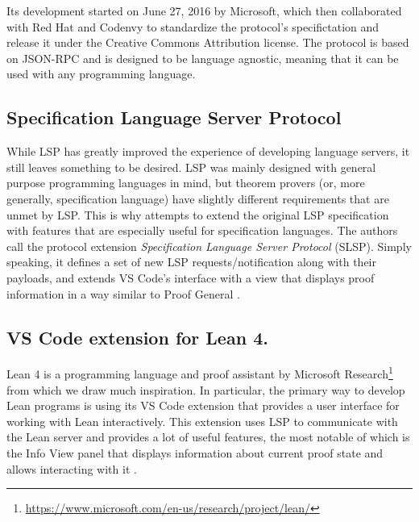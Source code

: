 Its development started on June 27, 2016 by Microsoft, which then collaborated with Red Hat and Codenvy to standardize the protocol's specifictation and release it under the Creative Commons Attribution license.
The protocol is based on JSON-RPC and is designed to be language agnostic, meaning that it can be used with any programming language.


\subsection{Specification Language Server Protocol}

While LSP has greatly improved the experience of developing language servers,
it still leaves something to be desired.
LSP was mainly designed with general purpose programming languages in mind,
but theorem provers (or, more generally, specification language) have slightly
different requirements that are unmet by LSP.
This is why \cite{JonasKjaerRask2021} attempts to extend the original LSP
specification with features that are especially useful for specification languages.
The authors call the protocol extension \textit{Specification Language Server Protocol} (SLSP).
Simply speaking, it defines a set of new LSP requests/notification along with
their payloads, and extends VS Code's interface with a view that displays proof
information in a way similar to Proof General \cite{Aspinall2000}.





\subsection{VS Code extension for Lean 4.}

Lean 4 \cite{deMouraUllrich2021} is a programming language and proof assistant
by Microsoft Research\footnote{\url{https://www.microsoft.com/en-us/research/project/lean/}}
from which we draw much inspiration.
In particular, the primary way to develop Lean programs is using its VS Code
extension that provides a user interface for working with Lean interactively.
This extension uses LSP to communicate with the Lean server and provides a lot
of useful features, the most notable of which is the Info View panel that
displays information about current proof state and allows interacting with it \cite{Nawrocki2023}.

